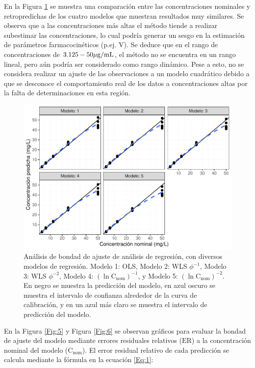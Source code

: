 \documentclass{article}
\begin{document}
\noindent
En la Figura \ref{Fig:4} se muestra una comparación entre las concentraciones nominales y retropredichas de los cuatro modelos que muestran resultados muy similares. Se observa que a las concentraciones más altas el método tiende a realizar subestimar las concentraciones, lo cual podría generar un sesgo en la estimación de parámetros farmacocinéticos (p.ej. $\mathrm{V}$). Se deduce que en el rango de concentraciones de $3.125-50\mathrm{\mu g/mL}$, el método no se encuentra en un rango lineal, pero aún podría ser considerado como rango dinámico. Pese a esto, no se considera realizar un ajuste de las observaciones a un modelo cuadrático debido a que se desconoce el comportamiento real de los datos a concentraciones altas por la falta de determinaciones en esta región. \\

\begin{figure}[ht]
	\centering
	\includegraphics[width=0.8\linewidth]{Figuras/24_Comparacion_CC_2.pdf}
		\caption[Diferentes modelos de regresión]{Análisis de bondad de ajuste de análisis de regresión, con diversos modelos de regresión. Modelo 1: OLS, Modelo 2: WLS $\phi^{-1}$, Modelo 3: WLS $\phi^{-2}$, Modelo 4: $\left(\ln{\mathrm{C_{nom}}}\right)^{-1}$, y Modelo 5: $\left(\ln{\mathrm{C_{nom}}}\right)^{-2}$. En negro se muestra la predicción del modelo, en azul oscuro se muestra el intervalo de confianza alrededor de la curva de calibración, y en un azul más claro se muestra el intervalo de predicción del modelo.}
	\label{Fig:4}
\end{figure}

\noindent
En la Figura \ref{Fig:5} y Figura \ref{Fig:6} se observan gráficos para evaluar la bondad de ajuste del modelo mediante errores residuales relativos ($ \mathrm{ER} $) a la concentración nominal del modelo ($\mathrm{C_{nom}}$). El error residual relativo de cada predicción se calcula mediante la fórmula en la ecuación \ref{Eq:1}: \\
\end{document}
